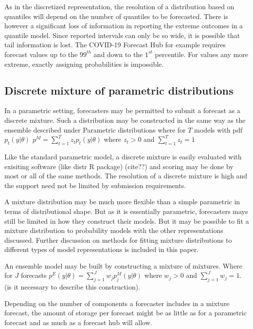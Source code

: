 \documentclass{article}\usepackage[]{graphicx}\usepackage[]{color}
\begin{document}
As in the
discretized representation, the resolution of a distribution based on quantiles
will depend on the number of quantiles to be forecasted. There is however a 
significant loss of information in reporting the extreme outcomes in a quantile
model. Since reported intervals can only be so wide, it is possible that tail 
information is lost. The COVID-19 Forecast Hub for example requires forecast 
values up to the $99^{th}$ and down to the $1^{st}$ percentile. For values any
more extreme, exactly assigning probabilities is impossible.





\subsection{Discrete mixture of parametric distributions}
In a parametric setting, forecasters may be permitted to submit a forecast as a
discrete mixture. Such a distribution may be constructed in the same way as the
ensemble described under Parametric distributions where for $T$ models with pdf
$p_t(y|\theta)$ $p^{M} = \sum_{t=1}^T z_tp_t(y|\theta)$ where 
$z_t > 0$ and $\sum_{t=1}^{T} z_t = 1$

Like the standard parametric model, a discrete mixture is easily evaluated with
exisiting software (like distr R package) (cite??) and scoring may be done by 
most or all of the same methods. The resolution of a discrete mixture is high 
and the support need not be limited by submission requirements. 

A mixture distribution may be much more flexible than a simple parametric in 
terms of distributional shape. But as it is essentially parametric, forecasters
mays still be limited in how they construct their models. But it may be possible
to fit a mixture distribution to probability models with the other 
representations discussed. Further discussion on methods for fitting mixture 
distributions to different types of model representations is included in this 
paper.

An ensemble model may be built by constructing a mixture of mixtures. Where for 
$J$ forecasts $p^{E}(y|\theta) = \sum_{j=1}^{J} w_j p^{M}_j(y|\theta)$ where 
$w_j > 0$ and $\sum_{j=1}^J w_j = 1$. (is it necessary to describe this
construction). 

Depending on the number of components a forecaster includes in a mixture 
forecast, the amount of storage per forecast might be as little as for a 
parametric forecast and as much as a forecast hub will allow.
\end{document}

